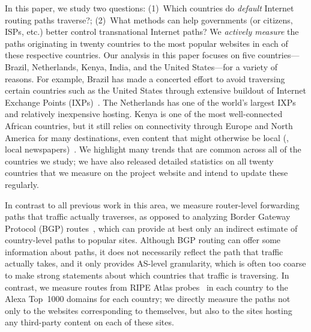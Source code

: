 In this paper, we study two questions: (1)~Which countries do {\em   default}
Internet routing paths traverse?; (2)~What methods can  help governments (or citizens, 
ISPs, etc.) better control transnational Internet paths?  We {\em actively
measure} the paths originating in twenty countries to the most popular
websites in each of these respective countries.
Our analysis in this paper focuses on five countries---Brazil, Netherlands,
Kenya, India, and the United States---for a variety of reasons.  For example,
Brazil has made a concerted effort to avoid traversing certain countries such
as the United States through extensive buildout of Internet Exchange Points
(IXPs)~\cite{brito2016dissecting}. The Netherlands has one of the world's largest IXPs and relatively
inexpensive hosting. Kenya is one of the most well-connected African
countries, but it still relies on connectivity through Europe and
North America for many destinations, even content that might otherwise be
local (\eg, local newspapers)~\cite{gupta2014peering,fanou2015diversity,chavula2014quantifying,fanou2016pushing}. We highlight many trends that are common across all
of the countries we study; we have also released detailed statistics on all twenty
countries that we measure on the project website and intend to update these regularly.

In contrast to all previous work in this area, we measure router-level
forwarding paths that traffic actually traverses, as opposed to analyzing Border
Gateway Protocol (BGP)
routes~\cite{karlin2009nation,shah2015characterizing}, which can provide at
best only an indirect estimate of country-level paths to popular sites.
Although BGP routing can offer some information about paths, it does not
necessarily reflect the path that traffic actually takes, and it only provides
AS-level granularity, which is often too coarse to make strong statements
about which countries that traffic is traversing.  In contrast, we measure
routes from RIPE Atlas probes~\cite{ripe_atlas} in each country to the Alexa
Top~1000 domains for each country; we directly measure the paths not only to
the websites corresponding to themselves, but also to the sites hosting any
third-party content on each of these sites.

